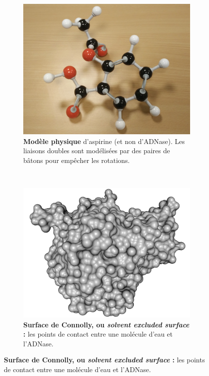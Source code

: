 \begin{appendices}
\begin{figure}[!htbp]
\begin{subfigure}[t]{\subImgW}
			\centering
			\includegraphics[width=\textwidth]{./figures/ch1/aspirin}
			\caption[Modèle physique de l'aspirine]{\textbf{Modèle physique }d'aspirine (et non d'ADNase). Les liaisons doubles sont modélisées par des paires de bâtons pour empêcher les rotations.}
			\label{fig:aspirin}
		\end{subfigure}
		~
		\begin{subfigure}[t]{\subImgW}
			\centering
			\includegraphics[width=\textwidth]{./figures/ch1/4awn_ses}
			\caption[Représentation en surface de Connolly]{\textbf{Surface de Connolly, ou \emph{solvent excluded surface} :} les points de contact entre une molécule d'eau et l'ADNase.}
			\label{fig:4awn_ses}

\end{subfigure}
\end{figure}
\end{appendices}

